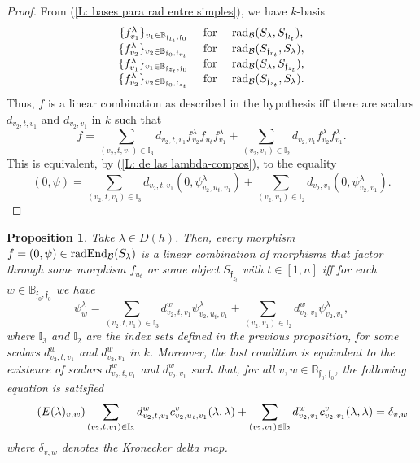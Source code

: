 \documentclass{article}
\newtheorem{proposition}[theorem]{Proposition}
\theoremstyle{definition}
\newcommand{\End}{{ \rm End }}
\newcommand{\rad}{{ \rm rad }}
\renewcommand{\frak}{\mathfrak}
\newcommand{\hueca}[1]{\mathbb{#1}}
\begin{document}
\begin{proof} From (\ref{L: bases para rad entre simples}), we have $k$-basis
$$\begin{matrix}
\{f^\lambda_{v_1}\}_{v_1\in \hueca{B}_{\frak{f}_{l_t},\frak{f}_0}} &\hbox{ for }& \rad_{\cal B}(S_\lambda,S_{\frak{f}_{l_t}}),\hfill\\
\{f^\lambda_{v_2}\}_{v_2\in \hueca{B}_{\frak{f}_0,\frak{f}_{r_t}}} &\hbox{ for }& \rad_{\cal B}(S_{\frak{f}_{r_t}},S_\lambda),\hfill\\
\{f^\lambda_{v_1}\}_{v_1\in \hueca{B}_{\frak{f}_{z_t},\frak{f}_0}} &\hbox{ for }& \rad_{\cal B}(S_\lambda,S_{\frak{f}_{z_t}}),\hfill\\
\{f^\lambda_{v_2}\}_{v_2\in \hueca{B}_{\frak{f}_0,\frak{f}_{z_t}}} &\hbox{ for }& \rad_{\cal B}(S_{\frak{f}_{z_t}},S_\lambda). \hfill\\
\end{matrix}$$
Thus, $f$ is a linear combination as described in the hypothesis iff there are scalars $d_{v_2,t,v_1}$ and $d_{v_2,v_1}$ in $k$ such that 
$$f=\sum_{(v_2,t,v_1)\in \hueca{I}_3}
d_{v_2,t,v_1}f^\lambda_{v_2}f_{u_t}f^\lambda_{v_1}
+
\sum_{(v_2,v_1)\in \hueca{I}_2}
d_{v_2,v_1}f^\lambda_{v_2}f^\lambda_{v_1}. $$
This is equivalent, by (\ref{L: de las lambda-compos}), to the equality
$$(0,\psi)=\sum_{(v_2,t,v_1)\in \hueca{I}_3}
d_{v_2,t,v_1}(0,\psi^\lambda_{v_2,u_t,v_1})
+
\sum_{(v_2,v_1)\in \hueca{I}_2}d_{v_2,v_1}(0,\psi^\lambda_{v_2,v_1}).$$
\end{proof}

\begin{proposition}\label{P: facts de endomorfs radicales de Slambda}
Take $\lambda\in D(h)$. Then, every morphism   $f=(0,\psi)\in \rad\End_{\cal B}(S_\lambda)$ is a linear combination of morphisms that factor through some morphism $f_{u_t}$ or some  object $S_{\frak{f}_{z_t}}$ with $t\in [1,n]$ iff for each $w\in \hueca{B}_{\frak{f}_0,\frak{f}_0}$ we have 
$$\psi^{\lambda}_w=\sum_{(v_2,t,v_1)\in \hueca{I}_3}
d^w_{v_2,t,v_1}\psi^\lambda_{v_2,u_t,v_1}
+
\sum_{(v_2,v_1)\in \hueca{I}_2}d^w_{v_2,v_1}\psi^\lambda_{v_2,v_1}, $$
where $\hueca{I}_3$ and $\hueca{I}_2$ are the index sets defined in the previous proposition, 
for some scalars $d^w_{v_2,t,v_1}$ and $d^w_{v_2,v_1}$ in $k$. Moreover, the last condition is equivalent to the existence of scalars  $d^w_{v_2,t,v_1}$ and $d^w_{v_2,v_1}$ such that, for all $v,w\in \hueca{B}_{\frak{f}_0,\frak{f}_0}$, the following equation is  satisfied 
\begin{equation}\tag{$E(\lambda)_{v,w}$}
\sum_{(v_2,t,v_1)\in \hueca{I}_3}
d^w_{v_2,t,v_1}c^v_{v_2,u_t,v_1}(\lambda,\lambda)
+
\sum_{(v_2,v_1)\in \hueca{I}_2}
d^w_{v_2,v_1}c^v_{v_2,v_1}(\lambda,\lambda)=\delta_{v,w}
\end{equation}
where $\delta_{v,w}$ denotes the Kronecker  delta map.
\end{proposition}
\end{document}
